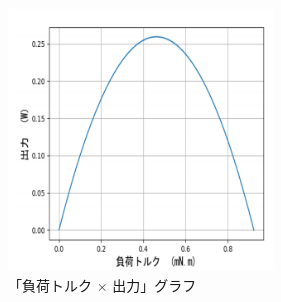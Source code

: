 \begin{figure}[t]
	\centering
	\includegraphics[width=7cm]{./Image/output.png}
	\caption{「負荷トルク $\times$ 出力」グラフ}
	\label{fig:output}
\end{figure}
